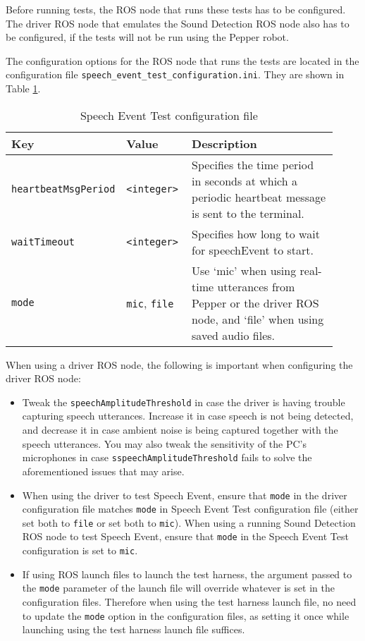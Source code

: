 \documentclass{CSSRforAfrica}
\begin{document}
Before running tests, the ROS node that runs these tests has to be configured. The driver ROS node that emulates the Sound Detection ROS node also has to be configured, if the tests will not be run using the Pepper robot.

The configuration options for the ROS node that runs the tests are located in the configuration file \texttt{speech\_event\_test\_configuration.ini}. They are shown in Table \ref{table:test-configuration}.

\begin{center}
\begin{table}[thb]
\begin{tabular}[thb]{|p{0.27\linewidth}|p{0.20\linewidth}|p{0.45\linewidth}|} \hline
\rowcolor{lightgray} Key & Value & Description \\ \hline
\texttt{heartbeatMsgPeriod} & \texttt{<integer>} & Specifies the time period in seconds at which
a periodic heartbeat message is sent to the terminal. \\ \hline
\texttt{waitTimeout} & \texttt{<integer>} & Specifies how long to wait for speechEvent to start. \\ \hline
\texttt{mode} & \texttt{mic}, \texttt{file} & Use `mic' when using real-time utterances from Pepper or the driver ROS node, and `file' when using saved audio files. \\ \hline
\end{tabular}
\caption{Speech Event Test configuration file}
\label{table:test-configuration}
\end{table}
\end{center}

When using a driver ROS node, the following is important when configuring the driver ROS node:

\begin{itemize}
    \item Tweak the \texttt{speechAmplitudeThreshold} in case the driver is having trouble capturing speech utterances. Increase it in case speech is not being detected, and decrease it in case ambient noise is being captured together with the speech utterances. You may also tweak the sensitivity of the PC's microphones in case \texttt{sspeechAmplitudeThreshold} fails to solve the aforementioned issues that may arise.
    \item When using the driver to test Speech Event, ensure that \texttt{mode} in the driver configuration file matches \texttt{mode} in Speech Event Test configuration file (either set both to \texttt{file} or set both to \texttt{mic}). When using a running Sound Detection ROS node to test Speech Event, ensure that \texttt{mode} in the Speech Event Test configuration is set to \texttt{mic}.
    \item If using ROS launch files to launch the test harness, the argument passed to the \texttt{mode} parameter of the launch file will override whatever is set in the configuration files. Therefore when using the test harness launch file, no need to update the \texttt{mode} option in the configuration files, as setting it once while launching using the test harness launch file suffices.
\end{itemize}
\end{document}
